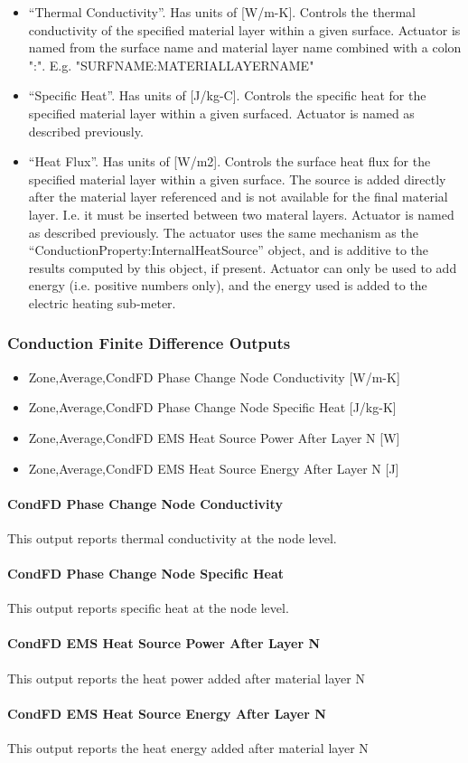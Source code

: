 \begin{itemize}
    \item ``Thermal Conductivity''. Has units of [W/m-K]. Controls the thermal conductivity of the specified material layer within a given surface. Actuator is named from the surface name and material layer name combined with a colon ":". E.g. "SURFNAME:MATERIALLAYERNAME"
    \item ``Specific Heat''. Has units of [J/kg-C]. Controls the specific heat for the specified material layer within a given surfaced. Actuator is named as described previously.
    \item ``Heat Flux''. Has units of [W/m2]. Controls the surface heat flux for the specified material layer within a given surface. The source is added directly after the material layer referenced and is not available for the final material layer. I.e. it must be inserted between two materal layers. Actuator is named as described previously. The actuator uses the same mechanism as the ``ConductionProperty:InternalHeatSource'' object, and is additive to the results computed by this object, if present. Actuator can only be used to add energy (i.e. positive numbers only), and the energy used is added to the electric heating sub-meter.
\end{itemize}

\subsubsection{Conduction Finite Difference Outputs}

\begin{itemize}
  \item Zone,Average,CondFD Phase Change Node Conductivity [W/m-K]
  \item Zone,Average,CondFD Phase Change Node Specific Heat [J/kg-K]
  \item Zone,Average,CondFD EMS Heat Source Power After Layer N [W]
  \item Zone,Average,CondFD EMS Heat Source Energy After Layer N [J]
\end{itemize}

\paragraph{CondFD Phase Change Node Conductivity}

This output reports thermal conductivity at the node level.

\paragraph{CondFD Phase Change Node Specific Heat}

This output reports specific heat at the node level.

\paragraph{CondFD EMS Heat Source Power After Layer N}

This output reports the heat power added after material layer N

\paragraph{CondFD EMS Heat Source Energy After Layer N}

This output reports the heat energy added after material layer N
